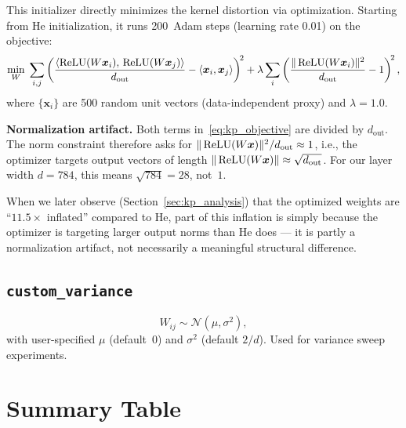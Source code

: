This initializer directly minimizes the kernel distortion via
optimization.  Starting from He initialization, it runs 200~Adam steps
(learning rate 0.01) on the objective:
\begin{equation}\label{eq:kp_objective}
  \min_W \;
  \sum_{i,j}
  \left(
    \frac{\langle \operatorname{ReLU}(W\bm{x}_i),\, \operatorname{ReLU}(W\bm{x}_j)\rangle}{d_{\mathrm{out}}}
    - \langle \bm{x}_i, \bm{x}_j \rangle
  \right)^{\!2}
  + \lambda
  \sum_i
  \left(
    \frac{\|\operatorname{ReLU}(W\bm{x}_i)\|^2}{d_{\mathrm{out}}} - 1
  \right)^{\!2},
\end{equation}
where $\{\bm{x}_i\}$ are 500 random unit vectors (data-independent
proxy) and $\lambda = 1.0$.

\begin{flagbox}
  \textbf{Normalization artifact.}
  Both terms in~\eqref{eq:kp_objective} are divided by
  $d_{\mathrm{out}}$.  The norm constraint therefore asks for
  $\|\operatorname{ReLU}(W\bm{x})\|^2 / d_{\mathrm{out}} \approx 1$, i.e.,
  the optimizer targets output vectors of length
  $\|\operatorname{ReLU}(W\bm{x})\| \approx \sqrt{d_{\mathrm{out}}}$.
  For our layer width $d = 784$, this means
  $\sqrt{784} = 28$, not~$1$.

  When we later observe (Section~\ref{sec:kp_analysis}) that the
  optimized weights are ``$11.5\times$ inflated'' compared to He,
  part of this inflation is simply because the optimizer is targeting
  larger output norms than He does --- it is partly a normalization
  artifact, not necessarily a meaningful structural difference.
\end{flagbox}

\subsection{\texttt{custom\_variance}}

\begin{equation}
  W_{ij} \sim \mathcal{N}(\mu, \sigma^2),
\end{equation}
with user-specified $\mu$ (default~0) and $\sigma^2$ (default $2/d$).
Used for variance sweep experiments.

\section{Summary Table}

